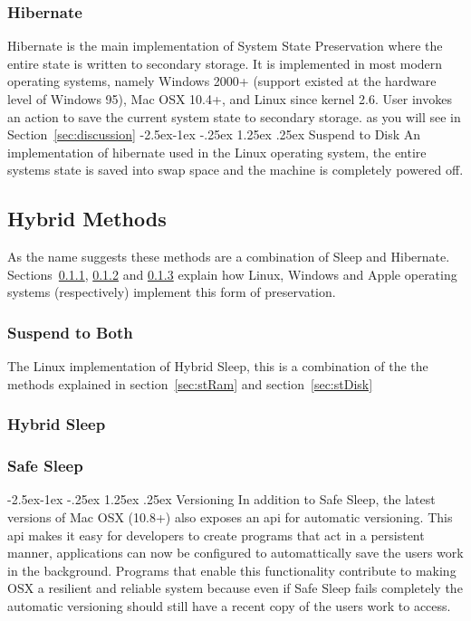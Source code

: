 \documentclass[a4,12pt]{article}
\makeatletter
\renewcommand\paragraph{\@startsection{paragraph}{4}{\z@}%
{-2.5ex\@plus -1ex \@minus -.25ex}%
{1.25ex \@plus .25ex}%
{\normalfont\normalsize\bfseries}}
\makeatother
\begin{document}
\subsubsection{Hibernate}
Hibernate is the main implementation of System State Preservation where the entire state is written to secondary storage. It is implemented in most modern operating systems, namely Windows 2000+ (support existed at the hardware level of Windows 95), Mac OSX 10.4+, and Linux since kernel 2.6.
User invokes an action to save the current system state to secondary storage.
as you will see in Section~\ref{sec:discussion}
\paragraph{Suspend to Disk}\label{sec:stDisk}
An implementation of hibernate used in the Linux operating system, the entire systems state is saved into swap space and the machine is completely powered off.\citep{Wiki}
\subsection{Hybrid Methods}
As the name suggests these methods are a combination of Sleep and Hibernate. Sections~\ref{sec:stb}, \ref{sec:hybridsleep} and \ref{sec:safesleep} explain how Linux, Windows and Apple operating systems (respectively) implement this form of preservation.
\subsubsection{Suspend to Both}\label{sec:stb}
The Linux implementation of Hybrid Sleep, this is a combination of the the methods explained in section~\ref{sec:stRam} and section~\ref{sec:stDisk}
\subsubsection{Hybrid Sleep}\label{sec:hybridsleep}
\subsubsection{Safe Sleep}\label{sec:safesleep}
\paragraph{Versioning}
In addition to Safe Sleep, the latest versions of Mac OSX (10.8+) also exposes an api for automatic versioning. This api makes it easy for developers to create programs that act in a persistent manner, applications can now be configured to automattically save the users work in the background. 
Programs that enable this functionality contribute to making OSX a resilient and reliable system because even if Safe Sleep fails completely the automatic versioning should still have a recent copy of the users work to access.
\end{document}
